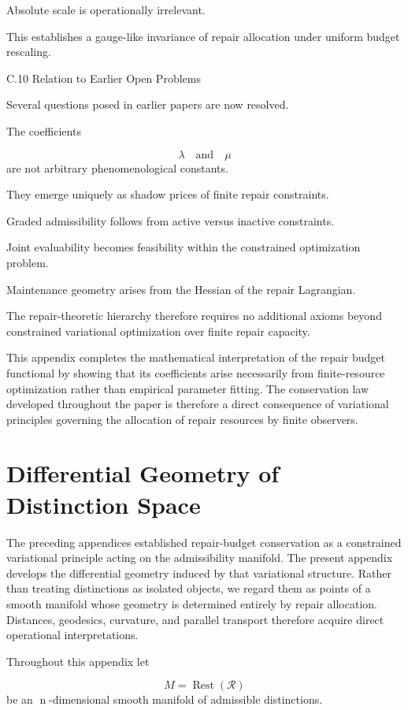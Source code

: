 \documentclass[12pt,oneside]{article}
\theoremstyle{plain}
\theoremstyle{definition}
\theoremstyle{remark}
\DeclareMathOperator{\Rest}{Rest}
\begin{document}
Absolute scale is operationally irrelevant.

This establishes a gauge-like invariance of repair allocation under uniform budget rescaling.


C.10 Relation to Earlier Open Problems

Several questions posed in earlier papers are now resolved.

The coefficients

\[
\lambda
\quad\text{and}\quad
\mu
\]
are not arbitrary phenomenological constants.

They emerge uniquely as shadow prices of finite repair constraints.

Graded admissibility follows from active versus inactive constraints.

Joint evaluability becomes feasibility within the constrained optimization problem.

Maintenance geometry arises from the Hessian of the repair Lagrangian.

The repair-theoretic hierarchy therefore requires no additional axioms beyond constrained variational optimization over finite repair capacity.

This appendix completes the mathematical interpretation of the repair budget functional by showing that its coefficients arise necessarily from finite-resource optimization rather than empirical parameter fitting. The conservation law developed throughout the paper is therefore a direct consequence of variational principles governing the allocation of repair resources by finite observers.

\section{Differential Geometry of Distinction Space}

The preceding appendices established repair-budget conservation as a constrained variational principle acting on the admissibility manifold. The present appendix develops the differential geometry induced by that variational structure. Rather than treating distinctions as isolated objects, we regard them as points of a smooth manifold whose geometry is determined entirely by repair allocation. Distances, geodesics, curvature, and parallel transport therefore acquire direct operational interpretations.

Throughout this appendix let

\[
M=\Rest(\mathcal R)
\]
be an n-dimensional smooth manifold of admissible distinctions.
\end{document}
